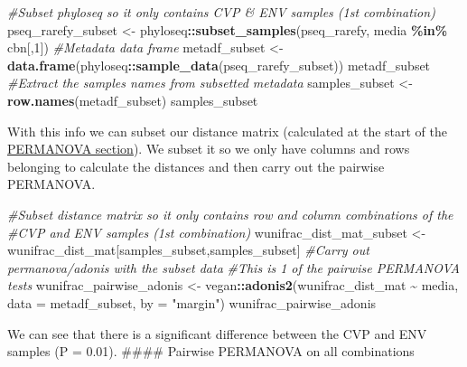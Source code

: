 \documentclass[
]{book}
\newenvironment{Shaded}{\begin{snugshade}}{\end{snugshade}}
\newcommand{\AttributeTok}[1]{\textcolor[rgb]{0.13,0.29,0.53}{#1}}
\newcommand{\CommentTok}[1]{\textcolor[rgb]{0.56,0.35,0.01}{\textit{#1}}}
\newcommand{\DecValTok}[1]{\textcolor[rgb]{0.00,0.00,0.81}{#1}}
\newcommand{\FunctionTok}[1]{\textcolor[rgb]{0.13,0.29,0.53}{\textbf{#1}}}
\newcommand{\NormalTok}[1]{#1}
\newcommand{\OtherTok}[1]{\textcolor[rgb]{0.56,0.35,0.01}{#1}}
\newcommand{\SpecialCharTok}[1]{\textcolor[rgb]{0.81,0.36,0.00}{\textbf{#1}}}
\newcommand{\StringTok}[1]{\textcolor[rgb]{0.31,0.60,0.02}{#1}}
\begin{document}
\begin{Shaded}
\begin{Highlighting}[]
\CommentTok{\#Subset phyloseq so it only contains CVP \& ENV samples (1st combination)}
\NormalTok{pseq\_rarefy\_subset }\OtherTok{\textless{}{-}}\NormalTok{ phyloseq}\SpecialCharTok{::}\FunctionTok{subset\_samples}\NormalTok{(pseq\_rarefy, media }\SpecialCharTok{\%in\%}\NormalTok{ cbn[,}\DecValTok{1}\NormalTok{])}
\CommentTok{\#Metadata data frame}
\NormalTok{metadf\_subset }\OtherTok{\textless{}{-}} \FunctionTok{data.frame}\NormalTok{(phyloseq}\SpecialCharTok{::}\FunctionTok{sample\_data}\NormalTok{(pseq\_rarefy\_subset))}
\NormalTok{metadf\_subset}
\CommentTok{\#Extract the samples names from subsetted metadata}
\NormalTok{samples\_subset }\OtherTok{\textless{}{-}} \FunctionTok{row.names}\NormalTok{(metadf\_subset)}
\NormalTok{samples\_subset}
\end{Highlighting}
\end{Shaded}

With this info we can subset our distance matrix (calculated at the start of the \protect\hyperlink{permanova}{PERMANOVA section}). We subset it so we only have columns and rows belonging to calculate the distances and then carry out the pairwise PERMANOVA.

\begin{Shaded}
\begin{Highlighting}[]
\CommentTok{\#Subset distance matrix so it only contains row and column combinations of the}
\CommentTok{\#CVP and ENV samples (1st combination)}
\NormalTok{wunifrac\_dist\_mat\_subset }\OtherTok{\textless{}{-}}\NormalTok{ wunifrac\_dist\_mat[samples\_subset,samples\_subset]}
\CommentTok{\#Carry out permanova/adonis with the subset data}
\CommentTok{\#This is 1 of the pairwise PERMANOVA tests}
\NormalTok{wunifrac\_pairwise\_adonis }\OtherTok{\textless{}{-}}\NormalTok{ vegan}\SpecialCharTok{::}\FunctionTok{adonis2}\NormalTok{(wunifrac\_dist\_mat }\SpecialCharTok{\textasciitilde{}}\NormalTok{ media, }
                                           \AttributeTok{data =}\NormalTok{ metadf\_subset, }\AttributeTok{by =} \StringTok{"margin"}\NormalTok{)}
\NormalTok{wunifrac\_pairwise\_adonis}
\end{Highlighting}
\end{Shaded}

We can see that there is a significant difference between the CVP and ENV samples (P = 0.01).
\#\#\#\# Pairwise PERMANOVA on all combinations
\end{document}
